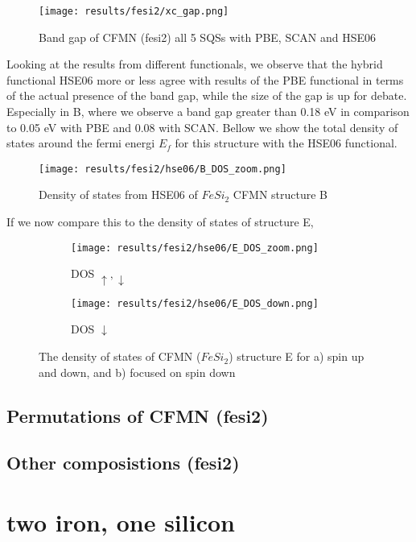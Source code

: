 \begin{figure}[H]
\centering
\texttt{[image: results/fesi2/xc\_gap.png]}
\caption{Band gap of CFMN (fesi2) all 5 SQSs with PBE, SCAN and HSE06}
\label{Xc_fig}
\end{figure}


Looking at the results from different functionals, we observe that the hybrid functional HSE06 more or less agree with results of the PBE functional in terms of the actual presence of the band gap, while the size of the gap is up for debate. Especially in B, where we observe a band gap greater than 0.18 eV in comparison to 0.05 eV with PBE and 0.08 with SCAN. Bellow we show the total density of states around the fermi energi $E_f$ for this structure with the HSE06 functional. 

\begin{figure}[H]
\centering
\texttt{[image: results/fesi2/hse06/B\_DOS\_zoom.png]}
\caption{Density of states from HSE06 of $FeSi_2$ CFMN structure B}
\label{DOS_hse06_B}
\end{figure}

If we now compare this to the density of states of structure E,

\begin{figure}[H]
\begin{subfigure}{0.5\textwidth}
\texttt{[image: results/fesi2/hse06/E\_DOS\_zoom.png]}
\caption{DOS $\uparrow, \downarrow$}
\end{subfigure}
\hfill
\begin{subfigure}{0.5\textwidth}
\texttt{[image: results/fesi2/hse06/E\_DOS\_down.png]}
\caption{DOS $\downarrow$}
\end{subfigure}
\caption{The density of states of CFMN ($FeSi_2$) structure E for a) spin up and down, and b) focused on spin down}
\end{figure}

\subsection{Permutations of CFMN (fesi2)}


\subsection{Other composistions (fesi2)}

\section{two iron, one silicon}

